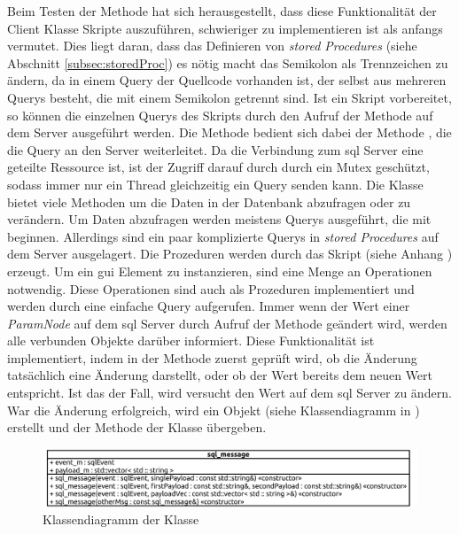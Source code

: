 Beim Testen der Methode hat sich herausgestellt, dass diese Funktionalität der  Client Klasse Skripte auszuführen, schwieriger zu implementieren ist als anfangs vermutet.
Dies liegt daran, dass das Definieren von \emph{stored Procedures} (siehe Abschnitt \ref{subsec:storedProc}) es nötig macht das Semikolon als Trennzeichen zu ändern, 
da in einem Query der Quellcode vorhanden ist, der selbst aus mehreren Querys besteht, die mit einem Semikolon getrennt sind.
Ist ein Skript vorbereitet, so können die einzelnen Querys des Skripts durch den Aufruf der Methode  auf dem Server ausgeführt werden.
Die Methode  bedient sich dabei der Methode , die die Query an den Server weiterleitet.
Da die Verbindung zum \ac{sql} Server eine geteilte Ressource ist, ist der Zugriff darauf durch  durch ein Mutex geschützt, sodass immer nur ein Thread gleichzeitig ein Query senden kann.
Die Klasse  bietet viele Methoden um die Daten in der Datenbank abzufragen oder zu verändern.
Um Daten abzufragen werden meistens Querys ausgeführt, die mit  beginnen.
Allerdings sind ein paar komplizierte Querys in \emph{stored Procedures} auf dem Server ausgelagert.
Die Prozeduren werden durch das Skript  (siehe Anhang ) erzeugt.
Um ein \ac{gui} Element zu instanzieren, sind eine Menge an Operationen notwendig.
Diese Operationen sind auch als Prozeduren implementiert und werden durch eine einfache  Query aufgerufen.
Immer wenn der Wert einer \emph{ParamNode} auf dem \ac{sql} Server durch Aufruf der Methode  geändert wird, werden alle verbunden  Objekte darüber informiert.
Diese Funktionalität ist implementiert, indem in der  Methode zuerst geprüft wird, ob die Änderung tatsächlich eine Änderung darstellt, oder ob der Wert bereits dem neuen Wert entspricht.
Ist das der Fall, wird versucht den Wert auf dem \ac{sql} Server zu ändern. War die Änderung erfolgreich, wird ein  Objekt (siehe Klassendiagramm in ) erstellt 
und der Methode  der Klasse  übergeben. 
\begin{figure}[ht]
  \centering
  \includegraphics[width=\textwidth]{content/hauptteil/umsetzungPoC/backend/uml/classesOfOverview/sql_message.pdf}
  \caption{Klassendiagramm der Klasse }
  \label{fig:backend:classDiag:sqlMsg}
\end{figure}
